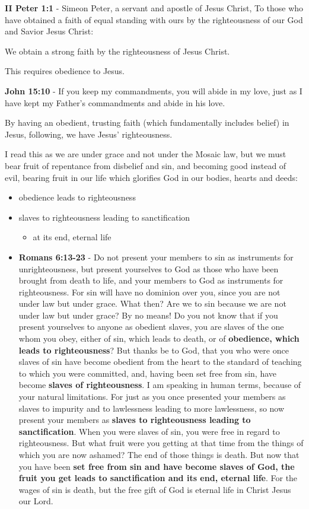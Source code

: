 \documentclass[11pt]{article}
\begin{document}
\textbf{II Peter 1:1} - Simeon Peter, a servant and apostle of Jesus Christ, To those who have obtained a faith of equal standing with ours by the righteousness of our God and Savior Jesus Christ:

We obtain a strong faith by the righteousness of Jesus Christ.

This requires obedience to Jesus.

\textbf{John 15:10} - If you keep my commandments, you will abide in my love, just as I have kept my Father's commandments and abide in his love.

By having an obedient, trusting faith (which fundamentally includes belief) in Jesus, following, we have Jesus' righteousness.

I read this as we are under grace and not
under the Mosaic law, but we must bear fruit
of repentance from disbelief and sin, and
becoming good instead of evil, bearing fruit
in our life which glorifies God in our bodies,
hearts and deeds:
\begin{itemize}
\item obedience leads to righteousness
\item slaves to righteousness leading to sanctification
\begin{itemize}
\item at its end, eternal life
\end{itemize}

\item \textbf{Romans 6:13-23} - Do not present your members to sin as instruments for unrighteousness, but present yourselves to God as those who have been brought from death to life, and your members to God as instruments for righteousness.  For sin will have no dominion over you, since you are not under law but under grace.  What then? Are we to sin because we are not under law but under grace? By no means!  Do you not know that if you present yourselves to anyone as obedient slaves, you are slaves of the one whom you obey, either of sin, which leads to death, or of \textbf{obedience, which leads to righteousness}?  But thanks be to God, that you who were once slaves of sin have become obedient from the heart to the standard of teaching to which you were committed, and, having been set free from sin, have become \textbf{slaves of righteousness}.  I am speaking in human terms, because of your natural limitations. For just as you once presented your members as slaves to impurity and to lawlessness leading to more lawlessness, so now present your members as \textbf{slaves to righteousness leading to sanctification}.  When you were slaves of sin, you were free in regard to righteousness.  But what fruit were you getting at that time from the things of which you are now ashamed? The end of those things is death.  But now that you have been \textbf{set free from sin and have become slaves of God, the fruit you get leads to sanctification and its end, eternal life}.  For the wages of sin is death, but the free gift of God is eternal life in Christ Jesus our Lord.
\end{itemize}
\end{document}
